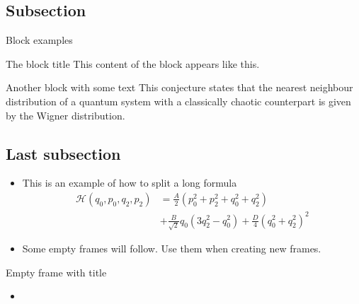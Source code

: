 \documentclass[a4,compress]{beamer}
\theoremstyle{plain}
\theoremstyle{definition}
\begin{document}

\subsection[Subsection]{Subsection}

\begin{frame}{Block examples}
  \begin{block}{The block title}
    This content of the block appears like this.
  \end{block}
  \begin{block}{Another block with some text}
    This conjecture states that the nearest neighbour distribution of a quantum system
    with a classically chaotic counterpart is given by the Wigner distribution.
  \end{block}
\end{frame}


\subsection[Last]{Last subsection}

\begin{frame}
  \begin{itemize}
    \item This is an example of how to split a long formula
    \[
    \begin{split}
      \mathcal{H}(q_0,p_0,q_2,p_2) &= \frac{A}{2}(p_0^2 + p_2^2 + q_0^2 + q_2^2) \\
      &+ \frac{B}{\sqrt{2}}q_0(3q_2^2 - q_0^2)
      + \frac{D}{4}{(q_0^2 + q_2^2)}^2
    \end{split}
    \]
	\item Some empty frames will follow. Use them when creating new frames.
  \end{itemize}
\end{frame}


\begin{frame}{Empty frame with title}
  \begin{itemize}
    \item 
  \end{itemize}
\end{frame}

\end{document}
